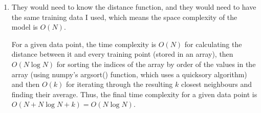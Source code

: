 \documentclass[submit]{harvardml}
\begin{document}
\begin{enumerate}
\item
    They would need to know the distance function, and they would need to have the same training data I used, which means the space complexity of the model is $O(N)$.

    For a given data point, the time complexity is $O(N)$ for calculating the distance between it and every training point (stored in an array), then $O(N\log N)$ for sorting the indices of the array by order of the values in the array (using numpy's argsort() function, which uses a quicksory algorithm) and then $O(k)$ for iterating through the resulting $k$ closest neighbours and finding their average. Thus, the final time complexity for a given data point is $O(N + N\log N + k) = O(N\log N)$.
\end{enumerate}

\newpage

\end{document}
